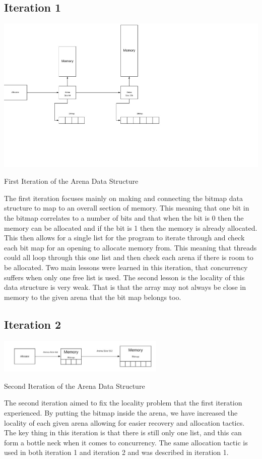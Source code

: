 \documentclass[conference]{IEEEtran}
\begin{document}
\subsection{Iteration 1}
\includegraphics[width=14cm]{iteration1datastructure.jpg}
\caption{First Iteration of the Arena Data Structure}
\label{fig1:Iteration1}
The first iteration focuses mainly on making and connecting the bitmap data structure to map to an overall section of memory. This meaning that one bit in the bitmap correlates to a number of bits and that when the bit is 0 then the memory can be allocated and if the bit is 1 then the memory is already allocated. This then allows for a single list for the program to iterate through and check each bit map for an opening to allocate memory from. This meaning that threads could all loop through this one list and then check each arena if there is room to be allocated. Two main lessons were learned in this iteration, that concurrency suffers when only one free list is used. The second lesson is the locality of this data structure is very weak. That is that the array may not always be close in memory to the given arena that the bit map belongs too. 


\subsection{Iteration 2} 
\includegraphics[width=8cm]{Iteration2datastructure.jpg}
\caption{Second Iteration of the Arena Data Structure}
\label{fig2:Iteration2}
The second iteration aimed to fix the locality problem that the first iteration experienced. By putting the bitmap inside the arena, we have increased the locality of each given arena allowing for easier recovery and allocation tactics. The key thing in this iteration is that there is still only one list, and this can form a bottle neck when it comes to concurrency. The same allocation tactic is used in both iteration 1 and iteration 2 and was described in iteration 1. 
\end{document}
